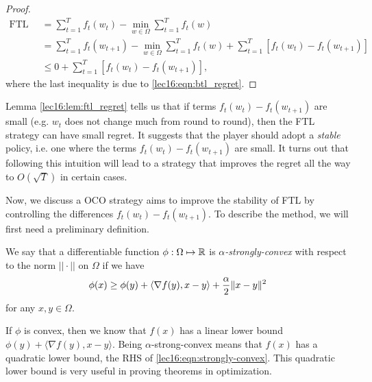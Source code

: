 \begin{proof}
\begin{align}
\text{FTL regret} &= \sum_{t = 1}^T f_t(w_t) - \min_{w \in \Omega} \sum_{t = 1}^T f_t(w) \\
&= \sum_{t = 1}^T f_t(w_{t+1}) - \min_{w \in \Omega} \sum_{t = 1}^T f_t(w) + \sum_{t = 1}^T [f_t(w_t) - f_t(w_{t+1})] \\
&\leq 0 + \sum_{t = 1}^T [f_t(w_t) - f_t(w_{t+1})],
\end{align}
where the last inequality is due to \eqref{lec16:eqn:btl_regret}.

\end{proof}

Lemma \ref{lec16:lem:ftl_regret} tells us that if terms $f_t(w_t) - f_t(w_{t+1})$ are small (e.g. $w_t$ does not change much from round to round), then the FTL strategy can have small regret. It suggests that the player should adopt a \textit{stable} policy, i.e. one where the terms $f_t(w_t) - f_t(w_{t+1})$ are small.  It turns out that following this intuition will lead to a strategy that improves the regret all the way to $O(\sqrt{T})$ in certain cases.


Now, we discuss a OCO strategy aims to improve the stability of FTL by controlling the differences $f_t(w_t) - f_t(w_{t+1})$. To describe the method, we will first need a preliminary definition.

\begin{definition}
We say that a differentiable function $\phi : \Omega \mapsto \mathbb R$ is \textit{$\alpha$-strongly-convex} with respect to the norm $|| \cdot ||$ on $\Omega$ if we have 
\begin{equation}\label{lec16:eqn:strongly-convex}
\phi(x) \geq \phi(y) + \langle \nabla f(y), x - y \rangle + \frac{\alpha}{2} \|x - y\|^2
\end{equation}
for any $x, y \in \Omega$.
\end{definition}

\begin{remark}
If $\phi$ is convex, then we know that $f(x)$ has a linear lower bound $\phi(y) + \langle \nabla f(y), x - y \rangle$. Being $\alpha$-strong-convex means that $f(x)$ has a quadratic lower bound, the RHS of \eqref{lec16:eqn:strongly-convex}. This quadratic lower bound is very useful in proving theorems in optimization.
\end{remark}

